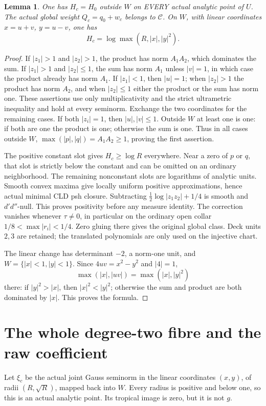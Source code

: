 \documentclass[11pt]{article}
\newtheorem{lemma}[theorem]{Lemma}
\newcommand{\DD}{d'd''}
\newcommand{\C}{\mathcal C}
\begin{document}
\begin{lemma}\label{positive}
One has $H_c=H_0$ outside $W$ on EVERY actual analytic point of $U$.
The actual global weight $Q_c=q_0+w_c$ belongs to $\C$.
On $W$, with linear coordinates $x=u+v$, $y=u-v$, one has
\[
 H_c=\log\max(R,|x|,|y|^2).
\]
\end{lemma}
\begin{proof}
If $|z_1|>1$ and $|z_2|>1$, the product has norm $A_1A_2$,
which dominates the sum. If $|z_1|>1$ and $|z_2|\le1$, the sum
has norm $A_1$ unless $|v|=1$, in which case the product already
has norm $A_1$. If $|z_1|<1$, then $|u|=1$; when $|z_2|>1$
the product has norm $A_2$, and when $|z_2|\le1$ either the product
or the sum has norm one. These assertions use only multiplicativity
and the strict ultrametric inequality and hold at every seminorm.
Exchange the two coordinates for the remaining cases.
If both $|z_i|=1$, then $|u|,|v|\le1$. Outside $W$ at least
one is one: if both are one the product is one; otherwise the sum
is one. Thus in all cases outside $W$,
$\max(|p|,|q|)=A_1A_2\ge1$, proving the first assertion.

The positive constant slot gives $H_c\ge\log R$ everywhere.
Near a zero of $p$ or $q$, that slot is strictly below the constant
and can be omitted on an ordinary neighborhood. The remaining
nonconstant slots are logarithms of analytic units. Smooth convex
maxima give locally uniform positive approximations, hence actual
minimal CLD psh closure. Subtracting $\tfrac12\log|z_1z_2|+1/4$
is smooth and $\DD$-null. This proves positivity before any measure
identity. The correction vanishes whenever $\tau\ne0$, in particular
on the ordinary open collar $1/8<\max|r_i|<1/4$. Zero gluing there
gives the original global class. Deck units $2,3$ are retained;
the translated polynomials are only used on the injective chart.

The linear change has determinant $-2$, a norm-one unit, and
$W=\{|x|<1,|y|<1\}$. Since $4uv=x^2-y^2$ and $|4|=1$,
\[
 \max(|x|,|uv|)=\max(|x|,|y|^2)
\]
there: if $|y|^2>|x|$, then $|x|^2<|y|^2$; otherwise the
sum and product are both dominated by $|x|$. This proves the formula.
\end{proof}

\section{The whole degree-two fibre and the raw coefficient}
Let $\xi_c$ be the actual joint Gauss seminorm in the linear
coordinates $(x,y)$, of radii $(R,\sqrt R)$, mapped back into $W$.
Every radius is positive and below one, so this is an actual analytic
point. Its tropical image is zero, but it is not $g$.
\end{document}
